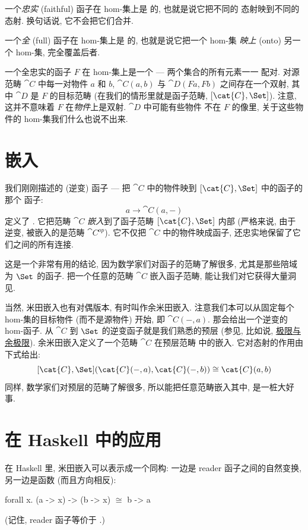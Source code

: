 一个\emph{忠实} (faithful) 函子在 hom-集上是  的, 也就是说它把不同的
态射映到不同的态射. 换句话说, 它不会把它们合并.

一个\emph{全} (full) 函子在 hom-集上是  的, 也就是说它把一个 hom-集
\emph{映上} (onto) 另一个 hom-集, 完全覆盖后者.

一个全忠实的函子 $F$ 在 hom-集上是一个  --- 两个集合的所有元素一一
配对. 对源范畴 $\cat{C}$ 中每一对物件 $a$ 和 $b$, $\cat{C}(a, b)$ 与 $\cat{D}(F a, F b)$
之间存在一个双射, 其中 $\cat{D}$ 是 $F$ 的目标范畴 (在我们的情形里就是函子范畴,
$[\cat{C}, \Set]$). 注意, 这并不意味着 $F$ 在\emph{物件}上是双射. $\cat{D}$ 中可能有些物件
不在 $F$ 的像里, 关于这些物件的 hom-集我们什么也说不出来.

\section{嵌入}

我们刚刚描述的 (逆变) 函子 --- 把 $\cat{C}$ 中的物件映到 $[\cat{C}, \Set]$ 中的函子的那个
函子:
\[a \to \cat{C}(a, -)\]
定义了 . 它把范畴 $\cat{C}$ \emph{嵌入}到了函子范畴
$[\cat{C}, \Set]$ 内部 (严格来说, 由于逆变, 被嵌入的是范畴 $\cat{C}^{op}$). 它不仅把
$\cat{C}$ 中的物件映成函子, 还忠实地保留了它们之间的所有连接.

这是一个非常有用的结论, 因为数学家们对函子的范畴了解很多, 尤其是那些陪域为 $\Set$ 的函子.
把一个任意的范畴 $\cat{C}$ 嵌入函子范畴, 能让我们对它获得大量洞见.

当然, 米田嵌入也有对偶版本, 有时叫作余米田嵌入. 注意我们本可以从固定每个 hom-集的目标物件
(而不是源物件) 开始, 即 $\cat{C}(-, a)$. 那会给出一个逆变的 hom-函子. 从 $\cat{C}$ 到
$\Set$ 的逆变函子就是我们熟悉的预层 (参见, 比如说,
\hyperref[limits-and-colimits]{极限与余极限}). 余米田嵌入定义了一个范畴 $\cat{C}$ 在预层范畴
中的嵌入. 它对态射的作用由下式给出:
\[[\cat{C}, \Set](\cat{C}(-, a), \cat{C}(-, b)) \cong \cat{C}(a, b)\]
同样, 数学家们对预层的范畴了解很多, 所以能把任意范畴嵌入其中, 是一桩大好事.

\section{在 Haskell 中的应用}

在 Haskell 里, 米田嵌入可以表示成一个同构: 一边是 reader 函子之间的自然变换, 另一边是函数
(而且方向相反):

\begin{snipv}
forall x. (a -> x) -> (b -> x) \ensuremath{\cong} b -> a
\end{snipv}
(记住, reader 函子等价于 .)

